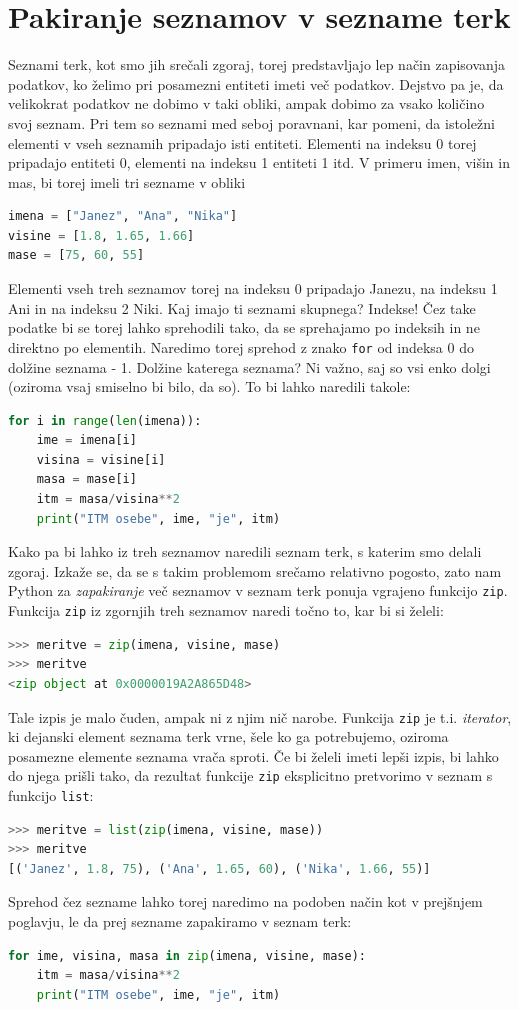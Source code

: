\section{Pakiranje seznamov v sezname terk}
Seznami terk, kot smo jih srečali zgoraj, torej predstavljajo lep način zapisovanja podatkov, ko želimo pri posamezni entiteti imeti več podatkov. Dejstvo pa je, da velikokrat podatkov ne dobimo v taki obliki, ampak dobimo za vsako količino svoj seznam. Pri tem so seznami med seboj poravnani, kar pomeni, da istoležni elementi v vseh seznamih pripadajo isti entiteti. Elementi na indeksu 0 torej pripadajo entiteti 0, elementi na indeksu 1 entiteti 1 itd. V primeru imen, višin in mas, bi torej imeli tri sezname v obliki 
\begin{lstlisting}[language=Python]
imena = ["Janez", "Ana", "Nika"]
visine = [1.8, 1.65, 1.66]
mase = [75, 60, 55]
\end{lstlisting}
Elementi vseh treh seznamov torej na indeksu 0 pripadajo Janezu, na indeksu 1 Ani in na indeksu 2 Niki. Kaj imajo ti seznami skupnega? Indekse! Čez take podatke bi se torej lahko sprehodili tako, da se sprehajamo po indeksih in ne direktno po elementih. Naredimo torej sprehod z znako \texttt{for} od indeksa 0 do dolžine seznama - 1. Dolžine katerega seznama? Ni važno, saj so vsi enko dolgi (oziroma vsaj smiselno bi bilo, da so). To bi lahko naredili takole:  
\begin{lstlisting}[language=Python]
for i in range(len(imena)):
    ime = imena[i]
    visina = visine[i]
    masa = mase[i]
    itm = masa/visina**2
    print("ITM osebe", ime, "je", itm)
\end{lstlisting}
Kako pa bi lahko iz treh seznamov naredili seznam terk, s katerim smo delali zgoraj. Izkaže se, da se s takim problemom srečamo relativno pogosto, zato nam Python za \emph{zapakiranje} več seznamov v seznam terk ponuja vgrajeno funkcijo \texttt{zip}. Funkcija \texttt{zip} iz zgornjih treh seznamov naredi točno to, kar bi si želeli: 
\begin{lstlisting}[language=Python]
>>> meritve = zip(imena, visine, mase)
>>> meritve
<zip object at 0x0000019A2A865D48>
\end{lstlisting}
Tale izpis je malo čuden, ampak ni z njim nič narobe. Funkcija \texttt{zip} je t.i. \emph{iterator}, ki dejanski element seznama terk vrne, šele ko ga potrebujemo, oziroma posamezne elemente seznama vrača sproti. Če bi želeli imeti lepši izpis, bi lahko do njega prišli tako, da rezultat funkcije \texttt{zip} eksplicitno pretvorimo v seznam s funkcijo \texttt{list}:
\begin{lstlisting}[language=Python]
>>> meritve = list(zip(imena, visine, mase))
>>> meritve
[('Janez', 1.8, 75), ('Ana', 1.65, 60), ('Nika', 1.66, 55)]
\end{lstlisting}
Sprehod čez sezname lahko torej naredimo na podoben način kot v prejšnjem poglavju, le da prej sezname zapakiramo v seznam terk:
\begin{lstlisting}[language=Python]
for ime, visina, masa in zip(imena, visine, mase):
    itm = masa/visina**2
    print("ITM osebe", ime, "je", itm)
\end{lstlisting}

